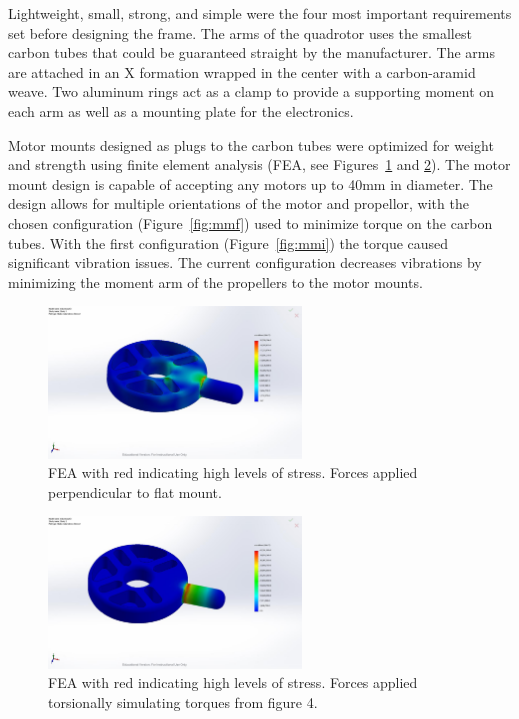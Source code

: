 \documentclass[12pt,letterpaper]{article} \usepackage[margin=1in]{geometry}
\begin{document}
Lightweight, small, strong, and simple were the four most important
requirements set before designing the frame. The arms of the quadrotor uses the
smallest carbon tubes that could be guaranteed straight by the manufacturer.
The arms are attached in an X formation wrapped in the center with
a carbon-aramid weave. Two aluminum rings act as a clamp to provide
a supporting moment on each arm as well as a mounting plate for the
electronics.

Motor mounts designed as plugs to the carbon tubes were optimized for weight
and strength using finite element analysis (FEA, see
Figures~\ref{fig:feastress} and \ref{fig:feastrain}). The motor mount design is
capable of accepting any motors up to 40mm in diameter. The design allows for
multiple orientations of the motor and propellor, with the chosen configuration
(Figure~\ref{fig:mmf}) used to minimize torque on the carbon tubes. With the
first configuration (Figure~\ref{fig:mmi}) the torque caused significant
vibration issues.  The current configuration decreases vibrations by minimizing
the moment arm of the propellers to the motor mounts. 

\begin{figure}[!h]
	\centering
	\includegraphics[width=0.6\textwidth]{img/fea_stress.jpg}
	\caption{FEA with red indicating high levels of stress. Forces applied perpendicular to flat mount.}
	\label{fig:feastress}
\end{figure}
 
\begin{figure}[!h]
	\centering
	\includegraphics[width=0.6\textwidth]{img/fea_strain.jpg}
	\caption{FEA with red indicating high levels of stress. Forces applied torsionally simulating torques from figure 4.}
	\label{fig:feastrain}
\end{figure}
\end{document}
